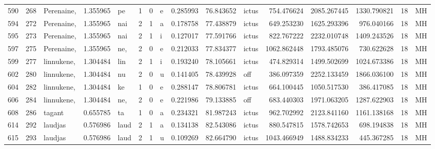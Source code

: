 \begin{tabular}{lrlrllllrrlrrrll}
590  &         268 &       Perenaine, &  1.355965 &      pe &        1 &      0 &       e &      0.285993 &     76.843652 &  ictus &   754.476624 &  2085.267445 &  1330.790821 &     18 &        MH \\
594  &         272 &       Perenaine, &  1.355965 &     nai &        2 &      1 &       a &      0.178758 &     77.438879 &  ictus &   649.253230 &  1625.293396 &   976.040166 &     18 &        MH \\
595  &         273 &       Perenaine, &  1.355965 &     nai &        2 &      1 &       i &      0.127017 &     77.591766 &  ictus &   822.767222 &  2232.010748 &  1409.243526 &     18 &        MH \\
597  &         275 &       Perenaine, &  1.355965 &     ne, &        2 &      0 &       e &      0.212033 &     77.834377 &  ictus &  1062.862448 &  1793.485076 &   730.622628 &     18 &        MH \\
599  &         277 &       linnukene, &  1.304484 &     lin &        2 &      1 &       i &      0.193240 &     78.105661 &  ictus &   474.829314 &  1499.502699 &  1024.673386 &     18 &        MH \\
602  &         280 &       linnukene, &  1.304484 &      nu &        2 &      0 &       u &      0.141405 &     78.439928 &    off &   386.097359 &  2252.133459 &  1866.036100 &     18 &        MH \\
604  &         282 &       linnukene, &  1.304484 &      ke &        1 &      0 &       e &      0.288147 &     78.806781 &  ictus &   664.100445 &  1050.517530 &   386.417085 &     18 &        MH \\
606  &         284 &       linnukene, &  1.304484 &     ne, &        2 &      0 &       e &      0.221986 &     79.133885 &    off &   683.440303 &  1971.063205 &  1287.622903 &     18 &        MH \\
608  &         286 &           tagant &  0.655785 &      ta &        1 &      0 &       a &      0.234321 &     81.987243 &  ictus &   962.702992 &  2123.841160 &  1161.138168 &     18 &        MH \\
614  &         292 &          laudjas &  0.576986 &    laud &        2 &      1 &       a &      0.134138 &     82.543086 &  ictus &   880.547815 &  1578.742653 &   698.194838 &     18 &        MH \\
615  &         293 &          laudjas &  0.576986 &    laud &        2 &      1 &       u &      0.109269 &     82.664790 &  ictus &  1043.466949 &  1488.834233 &   445.367285 &     18 &        MH \\

\end{tabular}
